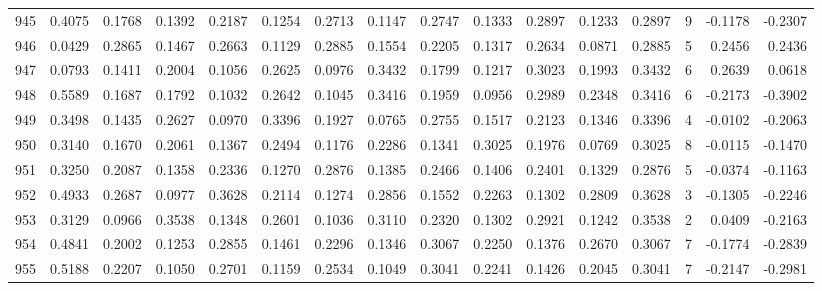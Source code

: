 \begin{tabular}{lrrrrrrrrrrrrrrr}
945 &      0.4075 &  0.1768 &  0.1392 &  0.2187 &  0.1254 &  0.2713 &  0.1147 &  0.2747 &  0.1333 &  0.2897 &   0.1233 &     0.2897 &      9 &                   -0.1178 &                    -0.2307 \\
946 &      0.0429 &  0.2865 &  0.1467 &  0.2663 &  0.1129 &  0.2885 &  0.1554 &  0.2205 &  0.1317 &  0.2634 &   0.0871 &     0.2885 &      5 &                    0.2456 &                     0.2436 \\
947 &      0.0793 &  0.1411 &  0.2004 &  0.1056 &  0.2625 &  0.0976 &  0.3432 &  0.1799 &  0.1217 &  0.3023 &   0.1993 &     0.3432 &      6 &                    0.2639 &                     0.0618 \\
948 &      0.5589 &  0.1687 &  0.1792 &  0.1032 &  0.2642 &  0.1045 &  0.3416 &  0.1959 &  0.0956 &  0.2989 &   0.2348 &     0.3416 &      6 &                   -0.2173 &                    -0.3902 \\
949 &      0.3498 &  0.1435 &  0.2627 &  0.0970 &  0.3396 &  0.1927 &  0.0765 &  0.2755 &  0.1517 &  0.2123 &   0.1346 &     0.3396 &      4 &                   -0.0102 &                    -0.2063 \\
950 &      0.3140 &  0.1670 &  0.2061 &  0.1367 &  0.2494 &  0.1176 &  0.2286 &  0.1341 &  0.3025 &  0.1976 &   0.0769 &     0.3025 &      8 &                   -0.0115 &                    -0.1470 \\
951 &      0.3250 &  0.2087 &  0.1358 &  0.2336 &  0.1270 &  0.2876 &  0.1385 &  0.2466 &  0.1406 &  0.2401 &   0.1329 &     0.2876 &      5 &                   -0.0374 &                    -0.1163 \\
952 &      0.4933 &  0.2687 &  0.0977 &  0.3628 &  0.2114 &  0.1274 &  0.2856 &  0.1552 &  0.2263 &  0.1302 &   0.2809 &     0.3628 &      3 &                   -0.1305 &                    -0.2246 \\
953 &      0.3129 &  0.0966 &  0.3538 &  0.1348 &  0.2601 &  0.1036 &  0.3110 &  0.2320 &  0.1302 &  0.2921 &   0.1242 &     0.3538 &      2 &                    0.0409 &                    -0.2163 \\
954 &      0.4841 &  0.2002 &  0.1253 &  0.2855 &  0.1461 &  0.2296 &  0.1346 &  0.3067 &  0.2250 &  0.1376 &   0.2670 &     0.3067 &      7 &                   -0.1774 &                    -0.2839 \\
955 &      0.5188 &  0.2207 &  0.1050 &  0.2701 &  0.1159 &  0.2534 &  0.1049 &  0.3041 &  0.2241 &  0.1426 &   0.2045 &     0.3041 &      7 &                   -0.2147 &                    -0.2981 \\

\end{tabular}
